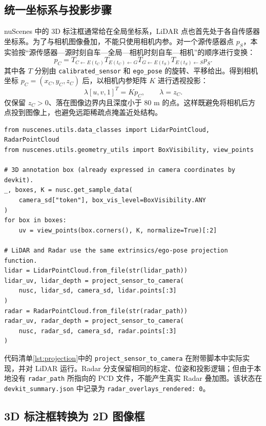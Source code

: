 \documentclass[UTF8,zihao=-4,fontset=windows]{ctexart}
\begin{document}
\subsection{统一坐标系与投影步骤}

nuScenes 中的 3D 标注框通常给在全局坐标系，LiDAR 点也首先处于各自传感器坐标系。为了与相机图像叠加，不能只使用相机内参。对一个源传感器点 $p_S$，本实验按“源传感器---源时刻自车---全局---相机时刻自车---相机”的顺序进行变换：
\[
p_C =
T_{C\leftarrow E(t_C)}
T_{E(t_C)\leftarrow G}
T_{G\leftarrow E(t_S)}
T_{E(t_S)\leftarrow S}p_S .
\]
其中各 $T$ 分别由 \texttt{calibrated\_sensor} 和 \texttt{ego\_pose} 的旋转、平移给出。得到相机坐标 $p_C=(x_C,y_C,z_C)$ 后，以相机内参矩阵 $K$ 进行透视投影：
\[
\lambda [u,v,1]^T=Kp_C,\qquad \lambda=z_C.
\]
仅保留 $z_C>0$、落在图像边界内且深度小于 80 m 的点。这样既避免将相机后方点投到图像上，也避免远距稀疏点掩盖近处结构。

\begin{lstlisting}[caption={3D 标注与 LiDAR/Radar 点云到相机平面的核心调用},label={lst:projection}]
from nuscenes.utils.data_classes import LidarPointCloud, RadarPointCloud
from nuscenes.utils.geometry_utils import BoxVisibility, view_points

# 3D annotation box (already expressed in camera coordinates by devkit).
_, boxes, K = nusc.get_sample_data(
    camera_sd["token"], box_vis_level=BoxVisibility.ANY
)
for box in boxes:
    uv = view_points(box.corners(), K, normalize=True)[:2]

# LiDAR and Radar use the same extrinsics/ego-pose projection function.
lidar = LidarPointCloud.from_file(str(lidar_path))
lidar_uv, lidar_depth = project_sensor_to_camera(
    nusc, lidar_sd, camera_sd, lidar.points[:3]
)
radar = RadarPointCloud.from_file(str(radar_path))
radar_uv, radar_depth = project_sensor_to_camera(
    nusc, radar_sd, camera_sd, radar.points[:3]
)
\end{lstlisting}

代码清单\ref{lst:projection}中的 \texttt{project\_sensor\_to\_camera} 在附带脚本中实际实现，并对 LiDAR 运行。Radar 分支保留相同的标定、位姿和投影逻辑；但由于本地没有 \texttt{radar\_path} 所指向的 PCD 文件，不能产生真实 Radar 叠加图。该状态在 \texttt{devkit\_summary.json} 中记录为 \texttt{radar\_overlays\_rendered: 0}。

\subsection{3D 标注框转换为 2D 图像框}
\end{document}
